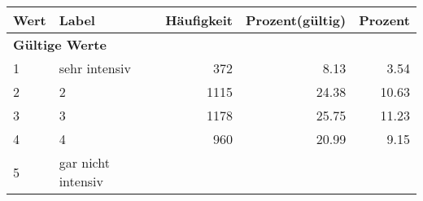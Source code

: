      \begin{longtable}{lXrrr}
     \toprule
     \textbf{Wert} & \textbf{Label} & \textbf{Häufigkeit} & \textbf{Prozent(gültig)} & \textbf{Prozent} \\
     \endhead
     \midrule
     \multicolumn{5}{l}{\textbf{Gültige Werte}}\\

     1 &
     \multicolumn{1}{X}{ sehr intensiv   } &


       \num{372} &
       \num[round-mode=places,round-precision=2]{8,13} &
         \num[round-mode=places,round-precision=2]{3,54} \\

     2 &
     \multicolumn{1}{X}{ 2   } &


       \num{1115} &
       \num[round-mode=places,round-precision=2]{24,38} &
         \num[round-mode=places,round-precision=2]{10,63} \\

     3 &
     \multicolumn{1}{X}{ 3   } &


       \num{1178} &
       \num[round-mode=places,round-precision=2]{25,75} &
         \num[round-mode=places,round-precision=2]{11,23} \\

     4 &
     \multicolumn{1}{X}{ 4   } &


       \num{960} &
       \num[round-mode=places,round-precision=2]{20,99} &
         \num[round-mode=places,round-precision=2]{9,15} \\

     5 &
     \multicolumn{1}{X}{ gar nicht intensiv   } &



\end{longtable}
